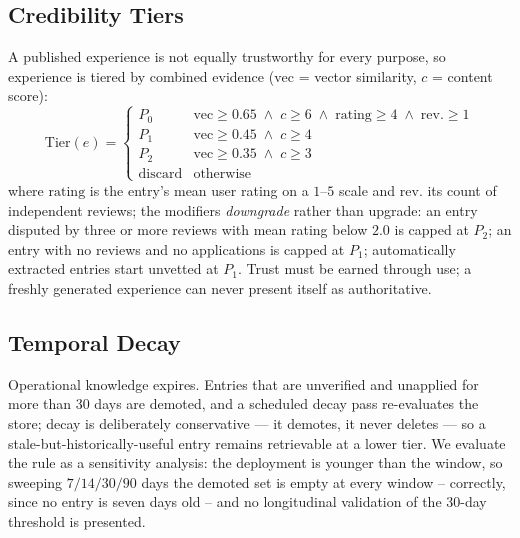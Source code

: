 \documentclass[sigconf, review, anonymous]{acmart}
\begin{document}
\subsection{Credibility Tiers}\label{sec:tiers}
A published experience is not equally trustworthy for every purpose, so
experience is tiered by combined evidence ($\mathrm{vec}$ = vector similarity,
$c$ = content score):
\begin{equation}
\mathrm{Tier}(e)=
\begin{cases}
P_0 & \mathrm{vec}\!\ge\!0.65 \;\wedge\; c\!\ge\!6 \;\wedge\; \mathrm{rating}\!\ge\!4 \;\wedge\; \mathrm{rev.}\!\ge\!1\\
P_1 & \mathrm{vec}\!\ge\!0.45 \;\wedge\; c\!\ge\!4\\
P_2 & \mathrm{vec}\!\ge\!0.35 \;\wedge\; c\!\ge\!3\\
\mathrm{discard} & \text{otherwise}
\end{cases}
\end{equation}
where $\mathrm{rating}$ is the entry's mean user rating on a $1$--$5$ scale
and $\mathrm{rev.}$ its count of independent reviews; the modifiers
\emph{downgrade} rather than upgrade: an entry disputed by
three or more reviews with mean rating below $2.0$ is capped at $P_2$; an entry
with no reviews and no applications is capped at $P_1$; automatically extracted
entries start unvetted at $P_1$. Trust must be earned through use; a freshly
generated experience can never present itself as authoritative.

\subsection{Temporal Decay}
Operational knowledge expires. Entries that are unverified and unapplied for
more than 30 days are demoted, and a scheduled decay pass re-evaluates the
store; decay is deliberately conservative --- it demotes, it never deletes ---
so a stale-but-historically-useful entry remains retrievable at a lower tier.
We evaluate the rule as a sensitivity analysis: the deployment is younger than
the window, so sweeping $7/14/30/90$ days the demoted set is empty at every
window -- correctly, since no entry is seven days old -- and no longitudinal
validation of the 30-day threshold is presented.
\end{document}
